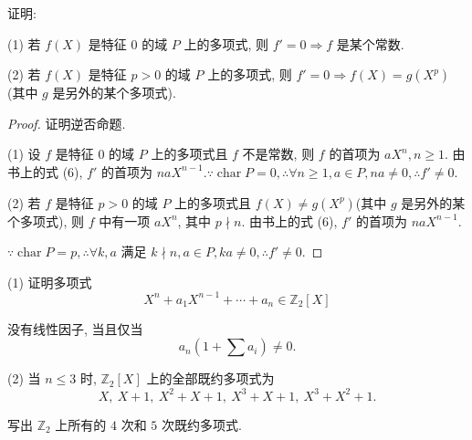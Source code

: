 \documentclass[UTF8]{ctexart}
\begin{document}
\begin{exercise}%
    证明:
    
    (1) 若 $f(X)$ 是特征 $0$ 的域 $P$ 上的多项式, 则 $f'=0\Rightarrow f$ 是某个常数.
    
    (2) 若 $f(X)$ 是特征 $p>0$ 的域 $P$ 上的多项式, 则 $f'=0\Rightarrow f(X)=g(X^p)$(其中 $g$ 是另外的某个多项式).
\end{exercise}
\begin{proof}
    证明逆否命题.

    (1) 设 $f$ 是特征 $0$ 的域 $P$ 上的多项式且 $f$ 不是常数, 则 $f$ 的首项为 $aX^n,n\geq1$. 由书上的式 (6), $f'$ 的首项为 $naX^{n-1}.\because\operatorname{char}P=0,\therefore\forall n\geq1,a\in P,na\neq0,\therefore f'\neq0$.

    (2) 若 $f$ 是特征 $p>0$ 的域 $P$ 上的多项式且 $f(X)\neq g(X^p)$(其中 $g$ 是另外的某个多项式), 则 $f$ 中有一项 $aX^n$, 其中 $p\nmid n$. 由书上的式 (6), $f'$ 的首项为 $naX^{n-1}$.
    
    $\because\operatorname{char}P=p,\therefore\forall k,a$ 满足 $k\nmid n,a\in P,ka\neq0,\therefore f'\neq0$.
\end{proof}
\addtocounter{exercise}{2}
\begin{exercise}%
    (1) 证明多项式
    \begin{equation}\label{eq5.1}
        X^n+a_1X^{n-1}+\cdots+a_n\in\mathbb{Z}_2[X]
    \end{equation}

    没有线性因子, 当且仅当
    \[a_n(1+\sum a_i)\neq0.\]

    (2) 当 $n\leq3$ 时, $\mathbb{Z}_2[X]$ 上的全部既约多项式为
    \[X,\ X+1,\ X^2+X+1,\ X^3+X+1,\ X^3+X^2+1.\]

    写出 $\mathbb{Z}_2$ 上所有的 $4$ 次和 $5$ 次既约多项式.
\end{exercise}
\end{document}
